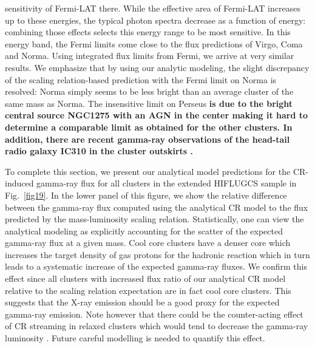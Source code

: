 \documentclass[10pt,aps,pra,reprint,amsmath,amsfonts,amssymb,showpacs,nofootinbib,floatfix]{revtex4-1}
\def\C#1{{\bf #1}}
\begin{document}
sensitivity of Fermi-LAT there. While the effective area of Fermi-LAT
increases up to these energies, the typical photon spectra decrease as
a function of energy: combining those effects selects this energy
range to be most sensitive.  In this energy band, the Fermi limits
come close to the flux predictions of Virgo, Coma and Norma. Using
integrated flux limits from Fermi, we arrive at very similar results.
We emphasize that by using our analytic modeling, the slight
discrepancy of the scaling relation-based prediction with the Fermi
limit on Norma \cite{2010ApJ...717L..71A} is resolved: Norma simply
seems to be less bright than an average cluster of the same mass as
Norma. The insensitive limit on Perseus \C{is due to the bright
  central source NGC1275 with an AGN in the center
  \cite{2010ATel.2916....1M} making it hard to determine a comparable
  limit as obtained for the other clusters. In addition, there are
recent gamma-ray observations of the head-tail radio galaxy IC310 in
the cluster outskirts \cite{2010ApJ...723L.207A,2010A&A...519L...6N}.}


To complete this section, we present our analytical model predictions
for the CR-induced gamma-ray flux for all clusters in the extended
HIFLUGCS sample in Fig.~\ref{fig19}. In the lower panel of this
figure, we show the relative difference between the gamma-ray flux
computed using the analytical CR model to the flux predicted by the
mass-luminosity scaling relation. Statistically, one can view the
analytical modeling as explicitly accounting for the scatter of the expected
gamma-ray flux at a given mass. Cool core clusters have a denser core
which increases the target density of gas protons for the hadronic
reaction which in turn leads to a systematic increase of the expected
gamma-ray fluxes. We confirm this effect since all clusters with
increased flux ratio of our analytical CR model relative to the scaling relation
expectation are in fact cool core clusters. This suggests that the X-ray
emission should be a good proxy for the expected gamma-ray
emission. Note however that there could be the counter-acting effect
of CR streaming in relaxed clusters which would tend to decrease the
gamma-ray luminosity \cite{2011A&A...527A..99E}. Future careful
modelling is needed to quantify this effect.
\end{document}
